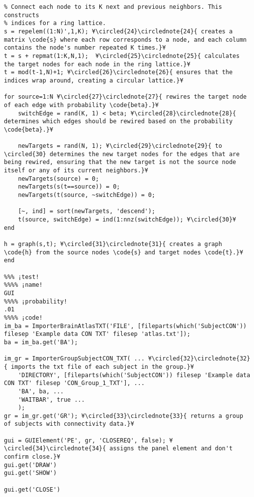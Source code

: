 \documentclass{tufte-handout}
\begin{document}
\begin{lstlisting}
% Connect each node to its K next and previous neighbors. This constructs
% indices for a ring lattice.
s = repelem((1:N)',1,K); ¥\circled{24}\circlednote{24}{ creates a matrix \code{s} where each row corresponds to a node, and each column contains the node's number repeated K times.}¥
t = s + repmat(1:K,N,1);  ¥\circled{25}\circlednote{25}{ calculates the target nodes for each node in the ring lattice.}¥
t = mod(t-1,N)+1; ¥\circled{26}\circlednote{26}{ ensures that the indices wrap around, creating a circular lattice.}¥

for source=1:N ¥\circled{27}\circlednote{27}{ rewires the target node of each edge with probability \code{beta}.}¥
    switchEdge = rand(K, 1) < beta; ¥\circled{28}\circlednote{28}{ determines which edges should be rewired based on the probability \code{beta}.}¥

    newTargets = rand(N, 1); ¥\circled{29}\circlednote{29}{ to \circled{30} determines the new target nodes for the edges that are being rewired, ensuring that the new target is not the source node itself or any of its current neighbors.}¥
    newTargets(source) = 0;
    newTargets(s(t==source)) = 0; 
    newTargets(t(source, ~switchEdge)) = 0; 
    
    [~, ind] = sort(newTargets, 'descend');
    t(source, switchEdge) = ind(1:nnz(switchEdge)); ¥\circled{30}¥
end

h = graph(s,t); ¥\circled{31}\circlednote{31}{ creates a graph \code{h} from the source nodes \code{s} and target nodes \code{t}.}¥
end

%%% ¡test!
%%%% ¡name!
GUI
%%%% ¡probability!
.01
%%%% ¡code!
im_ba = ImporterBrainAtlasTXT('FILE', [fileparts(which('SubjectCON')) filesep 'Example data CON TXT' filesep 'atlas.txt']);
ba = im_ba.get('BA');

im_gr = ImporterGroupSubjectCON_TXT( ... ¥\circled{32}\circlednote{32}{ imports the txt file of each subject in the group.}¥
    'DIRECTORY', [fileparts(which('SubjectCON')) filesep 'Example data CON TXT' filesep 'CON_Group_1_TXT'], ...
    'BA', ba, ...
    'WAITBAR', true ...
    );
gr = im_gr.get('GR'); ¥\circled{33}\circlednote{33}{ returns a group of subjects with connectivity data.}¥

gui = GUIElement('PE', gr, 'CLOSEREQ', false); ¥\circled{34}\circlednote{34}{ assigns the panel element and don't confirm close.}¥
gui.get('DRAW')
gui.get('SHOW')

gui.get('CLOSE')
\end{lstlisting}
\end{document}
